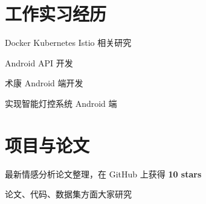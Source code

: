\documentclass[]{deedy-resume-openfont}
\begin{document}
\hfill
\begin{minipage}[t]{0.68\textwidth}


\section{工作实习经历}

\sectionsep
{}
\vspace{\topsep}
\vspace{\topsep}
\begin{tightemize}
\item Docker Kubernetes Istio 相关研究
\end{tightemize}
\sectionsep

\sectionsep
{}
\vspace{\topsep}
\vspace{\topsep}
\begin{tightemize}
\item Android API 开发
\end{tightemize}
\sectionsep

\sectionsep
{}
\vspace{\topsep}
\begin{tightemize}
\item 术康 Android 端开发
\end{tightemize}
\sectionsep

\sectionsep
{}
\vspace{\topsep}
\begin{tightemize}
\item 实现智能灯控系统 Android 端
\end{tightemize}
\sectionsep


\section{项目与论文}
\sectionsep

\begin{tightemize}
    \item 最新情感分析论文整理，在 GitHub 上获得 \textbf{10 stars}
    \item 论文、代码、数据集方面大家研究
    \end{tightemize}
\sectionsep


\end{minipage}
\end{document}
